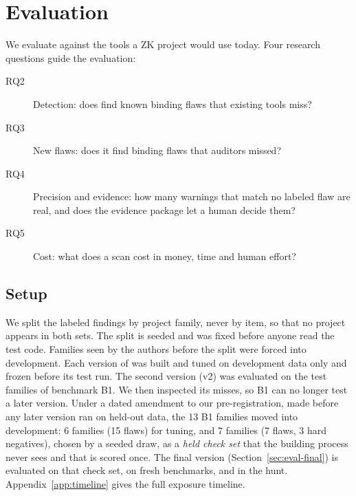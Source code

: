 \section{Evaluation}\label{sec:eval}

We evaluate \tool{} against the tools a ZK project would use today. Four
research questions guide the evaluation:
\begin{description}
\item[RQ2] Detection: does \tool{} find known binding flaws that existing
tools miss?
\item[RQ3] New flaws: does it find binding flaws that auditors missed?
\item[RQ4] Precision and evidence: how many warnings that match no labeled
flaw are real, and does the evidence package let a human decide them?
\item[RQ5] Cost: what does a scan cost in money, time and human effort?
\end{description}

\subsection{Setup}\label{sec:eval-setup}

We split the labeled findings by project family, never by item, so that no
project appears in both sets. The split is seeded and was fixed before anyone
read the test code. Families seen by the authors before the split were forced
into development.
Each version of \tool{} was built and tuned on development data only and
frozen before its test run. The second version (v2) was evaluated on the test
families of benchmark B1. We then inspected its misses, so B1 can no longer
test a later version. Under a dated amendment to our pre-registration, made
before any later version ran on held-out data, the 13 B1 families moved into
development: 6 families (15 flaws) for tuning, and 7 families (7 flaws, 3
hard negatives), chosen by a seeded draw, as a \emph{held check set} that the
building process never sees and that is scored once. The final version
(Section~\ref{sec:eval-final}) is evaluated on that check set, on fresh
benchmarks, and in the hunt.
Appendix~\ref{app:timeline} gives the full exposure timeline.

